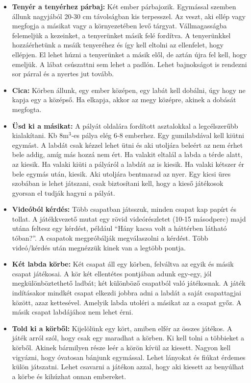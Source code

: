 \documentclass[a4paper, 12pt, twoside, openright]{article}
\begin{document}
\begin{itemize}
\item \textbf{Tenyér a tenyérhez párbaj:} Két ember párbajozik. Egymással szemben állunk nagyjából 20-30 cm távolságban kis terpesszel. Az veszt, aki ellép vagy megfogja a másikat vagy a környezetében levő tárgyat. Vállmagasságba felemeljük a kezeinket, a tenyerünket másik felé fordítva. A tenyerünkkel hozzáérhetünk a msáik tenyeréhez és így kell eltolni az ellenfelet, hogy ellépjen. El lehet húzni a tenyerünket a másik elől, de aztán újra fel kell, hogy emeljük. A lábat csúszattni sem lehet a padlón. Lehet bajnokságot is rendezni sor párral és a nyertes jut tovább.

\item \textbf{Cica:} Körben állunk, egy ember középen, egy labát kell dobálni, úgy hogy ne kapja egy a középső. Ha elkapja, akkor az megy középre, akinek a dobását megfogta.\\

\item \textbf{Üsd ki a másikat:} A pályát oldalára fordított asztalokkal a legcélszerűbb kialakítani. Kb 8m$^3$-es pálya elég 6-8 emberhez. Egy gumilabdával kell kiütni egymást. A labdát csak kézzel lehet ütni és aki utoljára beleért az nem érhet bele addig, amíg más hozzá nem ért. Ha valakit eltalál a labda a térde alatt, az kiesik. Ha valaki kiüti a pályáról a labdát az is kiesik. Ha valaki kétszer ér bele egymás után, kiesik. Aki utoljára bentmarad az nyer. Egy kicsi üres szobában is lehet játszani, csak biztosítani kell, hogy a kieső játékosok gyorsan el tudják hagyni a pályát.

\item \textbf{Videóból kérdés:} Több csapatban játsszuk, minden csapat kap papírt és tollat. A játékkvezető mutat egy rövid videórészletet (10-15 másodperc) majd utána feltesz egy kérdést, például ``Hány kacsa volt a háttérben látható tóban?''. A csapatok megpróbálják megválaszolni a kérdést. Több videó/kérdés után megnézzük kinek van a legtöbb pontja.


\item \textbf{Két labda körbe:} Két csapat áll egy körben, felváltva az egyik és másik csapat játékosai. A kör két ellentétes pontjában adunk egy-egy, jól megkülönböztethető ladbát; két különböző csapatból való játékosnak. A játék indításakor mindkét csapat elkezdi jobbra adni a labdát a saját csapattagjai között, azaz kettesével. Amelyik labda utoléri a másikat az a csapat győz. A másik csapat labdájához nem lehet érni.


\item \textbf{Told ki a körből:} Kijelölünk egy kört, amiben elfér az összes játékos. A játék arról szól, hogy csak egy maradhat a körben. Ki kell tolni a többieket a körből. Akinek bármilyen része leér a körön kívül az kiesett. Nagyon kell vigyázni, hogy óvatosan bánjunk egymással. Lehet lányokat és fiúkat érdemes külön játszatni. Lehet csavarni a játékon azzal, hogy aki kiesett az benyúlhat a körbe és kihúzhat onnan embereket.


\end{itemize}
\end{document}
